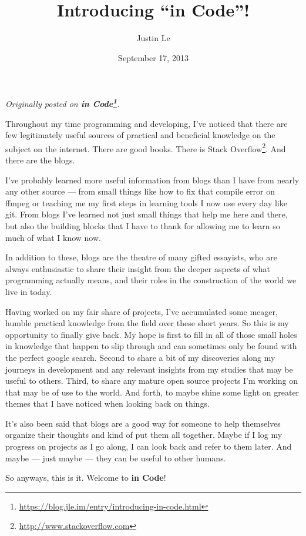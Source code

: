 \documentclass[]{article}
\title{Introducing ``in Code''!}
\author{Justin Le}
\date{September 17, 2013}
\renewcommand{\href}[2]{#2\footnote{\url{#1}}}
\begin{document}
\maketitle

\emph{Originally posted on
\textbf{\href{https://blog.jle.im/entry/introducing-in-code.html}{in
Code}}.}

Throughout my time programming and developing, I've noticed that there
are few legitimately useful sources of practical and beneficial
knowledge on the subject on the internet. There are good books. There is
\href{http://www.stackoverflow.com}{Stack Overflow}. And there are the
blogs.

I've probably learned more useful information from blogs than I have
from nearly any other source --- from small things like how to fix that
compile error on ffmpeg or teaching me my first steps in learning tools
I now use every day like git. From blogs I've learned not just small
things that help me here and there, but also the building blocks that I
have to thank for allowing me to learn so much of what I know now.

In addition to these, blogs are the theatre of many gifted essayists,
who are always enthusiastic to share their insight from the deeper
aspects of what programming actually means, and their roles in the
construction of the world we live in today.

Having worked on my fair share of projects, I've accumulated some
meager, humble practical knowledge from the field over these short
years. So this is my opportunity to finally give back. My hope is first
to fill in all of those small holes in knowledge that happen to slip
through and can sometimes only be found with the perfect google search.
Second to share a bit of my discoveries along my journeys in development
and any relevant insights from my studies that may be useful to others.
Third, to share any mature open source projects I'm working on that may
be of use to the world. And forth, to maybe shine some light on greater
themes that I have noticed when looking back on things.

It's also been said that blogs are a good way for someone to help
themselves organize their thoughts and kind of put them all together.
Maybe if I log my progress on projects as I go along, I can look back
and refer to them later. And maybe --- just maybe --- they can be useful
to other humans.

So anyways, this is it. Welcome to \textbf{in Code}!
\end{document}
